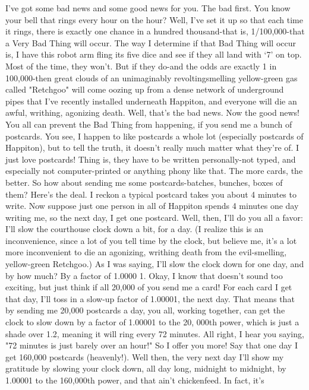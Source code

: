         I've got some bad news and some good news for you. The bad first. You know
your bell that rings every hour on the hour? Well, I've set it up so that each time it
rings, there is exactly one chance in a hundred thousand-that is, 1/100,000-that a Very
Bad Thing will occur. The way I determine if that Bad Thing will occur is, I have this
robot arm fling its five dice and see if they all land with `7' on top. Most of the time,
they won't. But if they do-and the odds are exactly 1 in 100,000-then great clouds of
an unimaginably revoltingsmelling yellow-green gas called "Retchgoo" will come
oozing up from a dense network of underground pipes that I've recently installed
underneath Happiton, and everyone will die an awful, writhing, agonizing death.
Well, that's the bad news.
        Now the good news! You all can prevent the Bad Thing from happening, if
you send me a bunch of postcards. You see, I happen to like postcards a whole lot
(especially postcards of Happiton), but to tell the truth, it doesn't really much matter
what they're of. I just love postcards! Thing is, they have to be written personally-not
typed, and especially not computer-printed or anything phony like that. The more
cards, the better. So how about sending me some postcards-batches, bunches, boxes of
them?
        Here's the deal. I reckon a typical postcard takes you about 4 minutes to write.
Now suppose just one person in all of Happiton spends 4 minutes one day writing me,
so the next day, I get one postcard. Well, then, I'll do you all a favor: I'll slow the
courthouse clock down a bit, for a day. (I realize this is an inconvenience, since a lot
of you tell time by the clock, but believe me, it's a lot more inconvenient to die an
agonizing, writhing death from the evil-smelling, yellow-green Retchgoo.) As I was
saying, I'll slow the clock down for one day, and by how much? By a factor of 1.0000
1. Okay, I know that doesn't sound too exciting, but just think if all 20,000 of you
send me a card! For each card I get that day, I'll toss in a slow-up factor of 1.00001,
the next day. That means that by sending me 20,000 postcards a day, you all, working
together, can get the clock to slow down by a factor of 1.00001 to the 20, 000th
power, which is just a shade over 1.2, meaning it will ring every 72 minutes.
        All right, I hear you saying, "72 minutes is just barely over an hour!" So I offer
you more! Say that one day I get 160,000 postcards (heavenly!). Well then, the very
next day I'll show my gratitude by slowing your clock down, all day long, midnight to
midnight, by 1.00001 to the 160,000th power, and that ain't chickenfeed. In fact, it's
